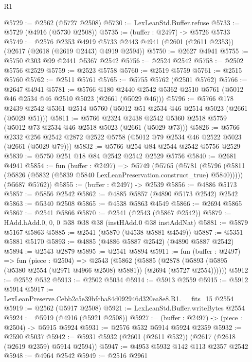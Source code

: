 \begin{lexlean}{R1}
\begin{coremodule}
@5729 := @2562 (@5727 @2508)
@5730 := LexLeanStd.Buffer.refuse
@5733 := @5729 (@4916 (@5730 @2508))
@5735 := (buffer : @2497) -> @5726 @5733
@5749 := @2576
    @2353
    @4919
    @5733
    @2443
    @4941
    (@2601 (@2611 @2353))
    (@2617 (@2618 (@2619 @2443) @4919 @2594))
@5750 := @2627 @4941
@5755 := @5750 @303 @99 @2441 @5367 @2542
@5756 := @2524 @2542
@5758 := @2502 @5756 @2529
@5759 := @2523 @5758
@5760 := @2519 @5759
@5761 := @2515 @5760
@5762 := @2511 @5761
@5765 := @5755 @5762 (@2501 @5762)
@5766 := @2647 @4941
@5781 := @5766
    @180
    @2440
    @2542
    @5362
    @2510
    @5761
    (@5012 @46 @2534 @46 @2510 @5023 (@2661 (@5029 @46)))
@5796 := @5766
    @178
    @2439
    @2542
    @5361
    @2514
    @5760
    (@5012 @51 @2534 @46 @2514 @5023 (@2661 (@5029 @51)))
@5811 := @5766
    @2324
    @2438
    @2542
    @5360
    @2518
    @5759
    (@5012 @73 @2534 @46 @2518 @5023 (@2661 (@5029 @73)))
@5826 := @5766
    @2332
    @256
    @2542
    @2872
    @2522
    @5758
    (@5012 @79 @2534 @46 @2522 @5023 (@2661 (@5029 @79)))
@5832 := @5766 @254 @84 @2544 @2542 @5756 @2529
@5839 := @5750 @251 @18 @84 @2542 @2542 @2529 @5756
@5840 := @2681 @4941
@5854 := fun (buffer : @2497) =>
  @5749
    (@5765
      (@5781 (@5796 (@5811 (@5826 (@5832 (@5839 @5840 LexLeanPreservation.construct_true) @5840)))))
      (@5687 @5762))
@5855 := (buffer : @2497) -> @2539
@5856 := @4886 @5173
@5857 := @5856 @2542
@5862 := @4885 @5857 (@4890 @5173 @2542) @2542
@5863 := @5340 @2508
@5865 := @4538 @5863 @4549
@5866 := @2694 @5865
@5867 := @2541 @5866
@5870 := @2541 (@2543 (@5867 @2542))
@5879 := HAdd.hAdd.{0, 0, 0} @38 @38 @38 (instHAdd.{0} @38 instAddNat)
@5881 := @5879 @5167 @5863
@5885 := @2541 (@5870 (@4538 @5881 @4549))
@5887 := @5351 @5881 @5170
@5893 := @4885 (@4886 @5887 @2542) (@4890 @5887 @2542)
@5894 := @2543 @2879
@5895 := @2541 @5894
@5911 := fun (buffer : @2497) =>
  fun (piece : @2504) =>
  @2543
    (@5862
      (@5885 (@2878 (@5893 (@5895 (@5380 @2554 (@2971 @4966 @2508) @5881)) (@2694 (@5727 @2554))))))
@5912 := @2552 @532
@5913 := @2502 @5034
@5914 := @5913 @2559
@5915 := @5912 @5914
@5917 := LexLeanPreserve.Cebb2c5e39bfcba84d092946d320ea8e8.R1.__fits_15 @2554
@5919 := @2562 (@5917 @2508)
@5921 := LexLeanStd.Buffer.writeBytes @2554
@5924 := @5919 (@4916 (@5921 @2508))
@5927 := (buffer : @2497) -> (piece : @2504) -> @5915 @5924
@5931 := @2576 @532 @5914 @5924 @2359
@5932 := @2590 @5037
@5942 := @5931 @5932 (@2601 (@2611 @532)) (@2617 (@2618 (@2619 @2359) @5914 @2594))
@5947 := @4953 @5932 @142 @113 @2357 @2542
@5948 := @4964 @2542
@5949 := @2516 @2961

\end{coremodule}
\end{lexlean}
